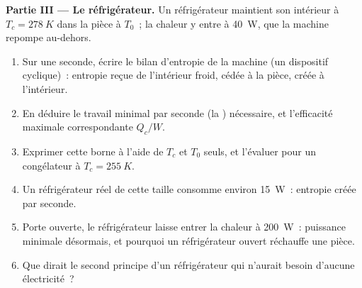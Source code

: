 \begin{problem}
\medskip
\noindent\textbf{Partie III --- Le réfrigérateur.}
Un réfrigérateur maintient son intérieur à $T_c = \qty{278}{K}$ dans la pièce à
$T_0$~; la chaleur y entre à \qty{40}{W}, que la machine repompe au-dehors.
\begin{enumerate}[resume]
  \item Sur une seconde, écrire le bilan d'entropie de la machine (un
        dispositif cyclique)~: entropie reçue de l'intérieur froid, cédée
        à la pièce, créée à l'intérieur.
  \item En déduire le travail minimal par seconde (la )
        nécessaire, et l'efficacité maximale correspondante
        $Q_c/W$.
  \item Exprimer cette borne à l'aide de $T_c$ et $T_0$ seuls, et l'évaluer
        pour un congélateur à $T_c = \qty{255}{K}$.
  \item Un réfrigérateur réel de cette taille consomme environ \qty{15}{W}~:
        entropie créée par seconde.
  \item Porte ouverte, le réfrigérateur laisse entrer la chaleur à
        \qty{200}{W}~: puissance minimale désormais, et pourquoi un
        réfrigérateur ouvert réchauffe une pièce.
  \item Que dirait le second principe d'un réfrigérateur qui n'aurait
        besoin d'aucune électricité~?
\end{enumerate}


\end{problem}
